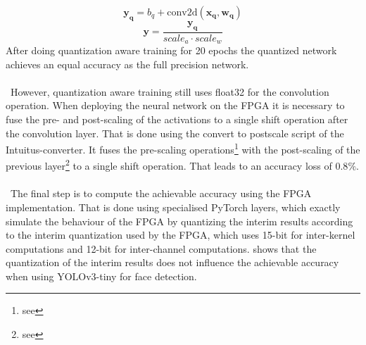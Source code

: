 \documentclass[%
a4paper,
twoside,
openany,
dvipsnames
]
{report}
\begin{document}
\begin{equation} \label{eq:conv-q}
	\mathbf{y_q} = b_q + \text{conv2d}(\mathbf{x_q},\mathbf{w_q})  
\end{equation}
\begin{equation} \label{eq:y-q}
	\mathbf{y} = \frac{\mathbf{y_q}}{scale_a \cdot scale_w }
\end{equation}
After doing quantization aware training for 20 epochs the quantized network achieves an equal accuracy as the full precision network. \\
\\\
However, quantization aware training still uses float32 for the convolution operation. When deploying the neural network on the \gls{FPGA} it is necessary to fuse the pre- and post-scaling of the activations to a single shift operation after the convolution layer. That is done using the convert to postscale script of the Intuitus-converter. It fuses the pre-scaling operations\footnote{see } with the post-scaling of the previous layer\footnote{see } to a single shift operation. That leads to an accuracy loss of $0.8\%$. \\
\\\
The final step is to compute the achievable accuracy using the \gls{FPGA} implementation. That is done using specialised PyTorch layers, which exactly simulate the behaviour of the \gls{FPGA} by quantizing the interim results according to the interim quantization used by the \gls{FPGA}, which uses 15-bit for inter-kernel computations and 12-bit for inter-channel computations. \Cref{tab:quantization-tasks} shows that the quantization of the interim results does not influence the achievable accuracy when using YOLOv3-tiny for face detection.   
\end{document}
